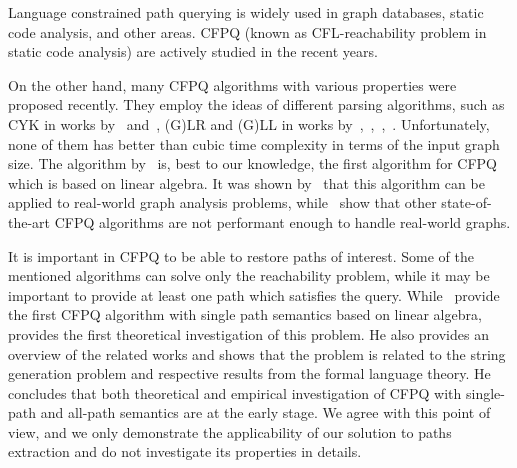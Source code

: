 
Language constrained path querying is widely used in graph databases, static code analysis, and other areas.
CFPQ (known as CFL-reachability problem in static code analysis) are actively studied in the recent years.

On the other hand, many CFPQ algorithms with various properties were proposed recently.
They employ the ideas of different parsing algorithms, such as CYK in works by~\cite{hellingsRelational} and~\cite{8249039}, (G)LR and (G)LL in works by~\cite{Grigorev:2017:CPQ:3166094.3166104},~\cite{Medeiros:2018:EEC:3167132.3167265},~\cite{10.1007/978-3-319-91662-0_17},~\cite{10.1007/978-3-319-41579-6_22}.
Unfortunately, none of them has better than cubic time complexity in terms of the input graph size.
The algorithm by~\cite{Azimov:2018:CPQ:3210259.3210264} is, best to our knowledge, the first algorithm for CFPQ which is based on linear algebra.
It was shown by~\cite{10.1145/3398682.3399163} that this algorithm can be applied to real-world graph analysis problems, while~\cite{Kuijpers:2019:ESC:3335783.3335791} show that other state-of-the-art CFPQ algorithms are not performant enough to handle real-world graphs.

It is important in CFPQ to be able to restore paths of interest.
Some of the mentioned algorithms can solve only the reachability problem, while it may be important to provide at least one path which satisfies the query.
While~\cite{10.1145/3398682.3399163} provide the first CFPQ algorithm with single path semantics based on linear algebra,~\cite{HellSinglePath} provides the first theoretical investigation of this problem.
He also provides an overview of the related works and shows that the problem is related to the string generation problem and respective results from the formal language theory.
He concludes that both theoretical and empirical investigation of CFPQ with single-path and all-path semantics are at the early stage.
We agree with this point of view, and we only demonstrate the applicability of our solution to paths extraction and do not investigate its properties in details.


